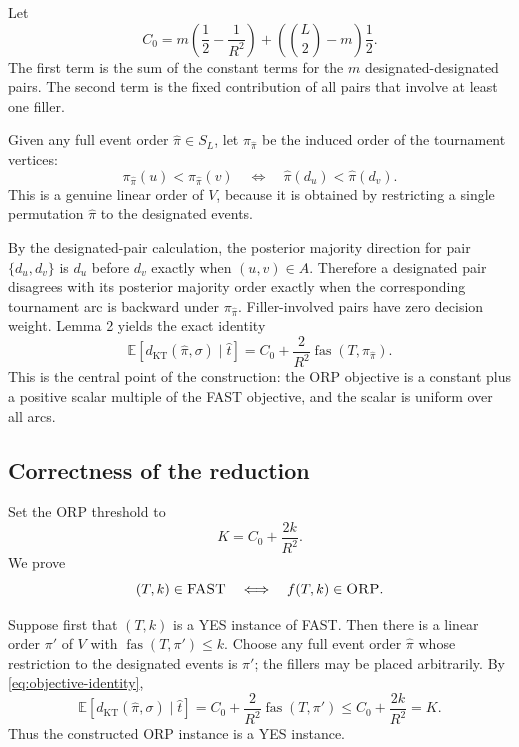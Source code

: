 \documentclass[11pt]{article}
\newcommand{\E}{\mathbb{E}}
\newcommand{\KT}{\operatorname{KT}}
\newcommand{\fas}{\operatorname{fas}}
\begin{document}
Let
\begin{equation}
  C_0=m\left(\frac12-\frac1{R^2}\right)
  +\left(\binom L2-m\right)\frac12 .
\end{equation}
The first term is the sum of the constant terms for the $m$ designated-designated pairs.  The second term is the fixed contribution of all pairs that involve at least one filler.

Given any full event order $\hat\pi\in S_L$, let $\pi_{\hat\pi}$ be the induced order of the tournament vertices:
\begin{equation}
  \pi_{\hat\pi}(u)<\pi_{\hat\pi}(v)
  \quad\Longleftrightarrow\quad
  \hat\pi(d_u)<\hat\pi(d_v).
\end{equation}
This is a genuine linear order of $V$, because it is obtained by restricting a single permutation $\hat\pi$ to the designated events.

By the designated-pair calculation, the posterior majority direction for pair $\{d_u,d_v\}$ is $d_u$ before $d_v$ exactly when $(u,v)\in A$.  Therefore a designated pair disagrees with its posterior majority order exactly when the corresponding tournament arc is backward under $\pi_{\hat\pi}$.  Filler-involved pairs have zero decision weight.  Lemma 2 yields the exact identity
\begin{equation}
  \E\left[d_{\KT}(\hat\pi,\sigma)\mid \hat t\right]
  =C_0+\frac2{R^2}\fas(T,\pi_{\hat\pi}).
  \label{eq:objective-identity}
\end{equation}
This is the central point of the construction: the ORP objective is a constant plus a positive scalar multiple of the FAST objective, and the scalar is uniform over all arcs.

\subsection{Correctness of the reduction}

Set the ORP threshold to
\begin{equation}
  K=C_0+\frac{2k}{R^2}.
\end{equation}
We prove
\begin{equation}
  (T,k)\in\textsc{FAST}
  \quad\Longleftrightarrow\quad
  f(T,k)\in\textsc{ORP}.
\end{equation}

Suppose first that $(T,k)$ is a YES instance of FAST.  Then there is a linear order $\pi'$ of $V$ with $\fas(T,\pi')\le k$.  Choose any full event order $\hat\pi$ whose restriction to the designated events is $\pi'$; the fillers may be placed arbitrarily.  By \eqref{eq:objective-identity},
\begin{equation}
  \E\left[d_{\KT}(\hat\pi,\sigma)\mid \hat t\right]
  =C_0+\frac2{R^2}\fas(T,\pi')
  \le C_0+\frac{2k}{R^2}=K.
\end{equation}
Thus the constructed ORP instance is a YES instance.
\end{document}
